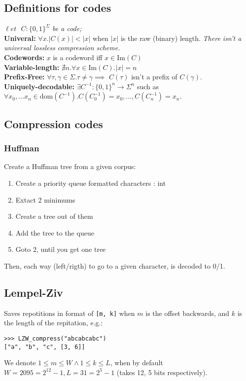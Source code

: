 \documentclass[]{article}
\newcommand\set   {\ell et \text{ }}
\newcommand\dom   {\mathrm{dom}}
\newcommand\Img   {\mathrm{Im}}
\newcommand\op    {^{-1}}
\begin{document}
	\begin{multicols}{2}
		
		\subsection{Definitions for codes}
		$\set C \colon \{0, 1\}^\Sigma$ \textit{be a code;} \\
		\textbf{Univeral: }$\forall x. |C(x)| < |x|$ when $|x|$ is the raw (binary) length. \textit{There isn't a universal lossless compression scheme. }\\
		\textbf{Codewords: } $x$ is a codeword iff $x \in \Img(C)$ \\
		\textbf{Variable-length: } $\nexists n. \forall x \in \Img(C). |x| = n$ \\
		\textbf{Prefix-Free: }$\forall \tau, \gamma \in \Sigma. \tau \neq \gamma \!\!\!\implies\!\!\!\!$ $C(\tau)$ isn't a prefix of $C(\gamma)$. \\
		\textbf{Uniquely-decodable: }$\exists C\op \colon \{0, 1\}^n \to \Sigma^n$ such as $\forall x_0, \dots x_n \in \dom(C\op). C(C\op_0) = x_0, \dots, C(C\op_n) = x_n$. 
		
		\subsection{Compression codes}
		\subsubsection{Huffman}
		Create a Huffman tree from a given corpus: 
		\begin{enumerate}
			\item Create a priority queue formatted characters : int
			\item Extact 2 minimums
			\item Create a tree out of them
			\item Add the tree to the queue
			\item Goto 2, until you get one tree
		\end{enumerate}
		Then, each way (left/rigth) to go to a given character, is decoded to 0/1. 
		
		\subsection{Lempel-Ziv}
		Saves repotitions in format of \texttt{[m, k]} when $m$ is the offset backwards, and $k$ is the length of the repitation, e.g.: 
		\begin{lstlisting}[emph={LZW_compress}]
>>> LZW_compress("abcabcabc")
["a", "b", "c", [3, 6]]	\end{lstlisting}
		We denote $1 \le m \le W \land 1 \le k \le L$, when by default $W = 2095 = 2^{12} - 1, L = 31 = 2^{5} - 1$ (takes 12, 5 bits respectively). 
		

\end{multicols}
\end{document}
